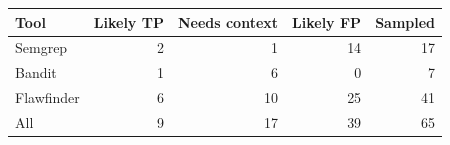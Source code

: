 \begin{tabular}{@{}lrrrr@{}}
\toprule
Tool & Likely TP & Needs context & Likely FP & Sampled \\
\midrule
Semgrep & 2 & 1 & 14 & 17 \\
Bandit & 1 & 6 & 0 & 7 \\
Flawfinder & 6 & 10 & 25 & 41 \\
\midrule
All & 9 & 17 & 39 & 65 \\
\bottomrule
\end{tabular}

